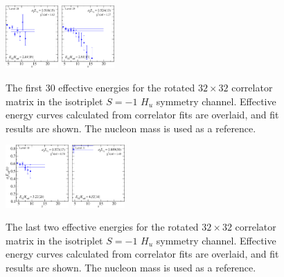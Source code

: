 \begin{figure}[H]
    \includegraphics[width=0.18\textwidth]{figures/sigmas/hu/fits/fit_26.pdf}
    \includegraphics[width=0.18\textwidth]{figures/sigmas/hu/fits/fit_24.pdf}
    \caption{The first 30 effective energies for the rotated $32\times 32$ correlator matrix in the isotriplet $S=-1$ $H_u$ symmetry channel. Effective energy curves calculated from correlator fits are overlaid, and fit results are shown. The nucleon mass is used as a reference.}\label{fig:hu_fits1}
\end{figure}

\begin{figure}[H]
    \centering
    \includegraphics[width=0.215\textwidth]{figures/sigmas/hu/fits/fit_28.pdf}
    \includegraphics[width=0.18\textwidth]{figures/sigmas/hu/fits/fit_31.pdf}
    \caption{The last two effective energies for the rotated $32\times 32$ correlator matrix in the isotriplet $S=-1$ $H_u$ symmetry channel. Effective energy curves calculated from correlator fits are overlaid, and fit results are shown. The nucleon mass is used as a reference.}\label{fig:hu_fits2}
\end{figure}

